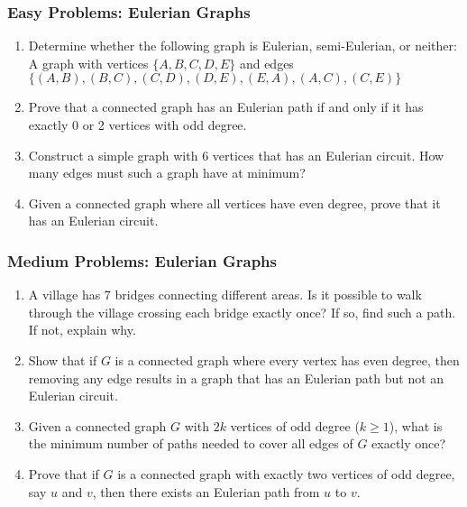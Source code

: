\documentclass{article}
\theoremstyle{definition}
\begin{document}
\subsubsection{Easy Problems: Eulerian Graphs}
\begin{enumerate}
    \item Determine whether the following graph is Eulerian, semi-Eulerian, or neither:
    A graph with vertices $\{A, B, C, D, E\}$ and edges $\{(A,B), (B,C), (C,D), (D,E), (E,A), (A,C), (C,E)\}$
    
    \item Prove that a connected graph has an Eulerian path if and only if it has exactly 0 or 2 vertices with odd degree.
    
    \item Construct a simple graph with 6 vertices that has an Eulerian circuit. How many edges must such a graph have at minimum?
    
    \item Given a connected graph where all vertices have even degree, prove that it has an Eulerian circuit.

    
\end{enumerate}

\subsubsection{Medium Problems: Eulerian Graphs}
\begin{enumerate}[resume]
    \item A village has 7 bridges connecting different areas. Is it possible to walk through the village crossing each bridge exactly once? If so, find such a path. If not, explain why.
    
    \item Show that if $G$ is a connected graph where every vertex has even degree, then removing any edge results in a graph that has an Eulerian path but not an Eulerian circuit.
    
    \item Given a connected graph $G$ with $2k$ vertices of odd degree ($k \geq 1$), what is the minimum number of paths needed to cover all edges of $G$ exactly once?
    
    \item Prove that if $G$ is a connected graph with exactly two vertices of odd degree, say $u$ and $v$, then there exists an Eulerian path from $u$ to $v$.
\end{enumerate}
\end{document}
